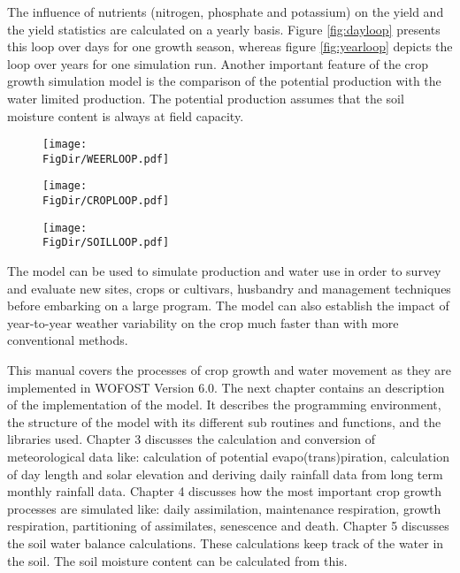 The influence of nutrients (nitrogen, phosphate and potassium) on the yield and the
yield statistics are calculated on a yearly basis. 
Figure \ref{fig:dayloop} presents this loop over days for one growth season, 
whereas figure \ref{fig:yearloop} depicts the loop over years for one simulation run.
Another important feature of the crop growth simulation model is the comparison of
the potential production with the water limited production. The potential production
assumes that the soil moisture content is always at field capacity.

\begin{figure}[htbp]
\centering
\texttt{[image: \\FigDir/WEERLOOP.pdf]}
\end{figure}

\begin{figure}[htbp]
\centering
\texttt{[image: \\FigDir/CROPLOOP.pdf]}
\end{figure}

\begin{figure}[htbp]
\centering
\texttt{[image: \\FigDir/SOILLOOP.pdf]}
\end{figure}

The model can be used to simulate production and water use in order to survey
and evaluate new sites, crops or cultivars, husbandry and management techniques 
before embarking on a large
program. The model can also establish the impact of year-to-year weather variability
on the crop much faster than with more conventional methods. 

This manual covers the processes of crop growth and water movement as they are
implemented in WOFOST Version 6.0. 
The next chapter contains an description of the implementation of the model. It
describes the programming environment, the structure of the model with its different
sub routines and functions, and the libraries used.
Chapter 3 discusses the calculation and conversion of meteorological data like:
calculation of potential evapo(trans)piration, calculation of day length and solar
elevation and deriving daily rainfall data from long term monthly rainfall data.
Chapter 4 discusses how the most important crop growth processes are simulated
like: daily assimilation, maintenance respiration, growth respiration, partitioning of
assimilates, senescence and death. Chapter 5 discusses the soil water balance
calculations. These calculations keep track of the water in the soil. The soil moisture
content can be calculated from this. 

